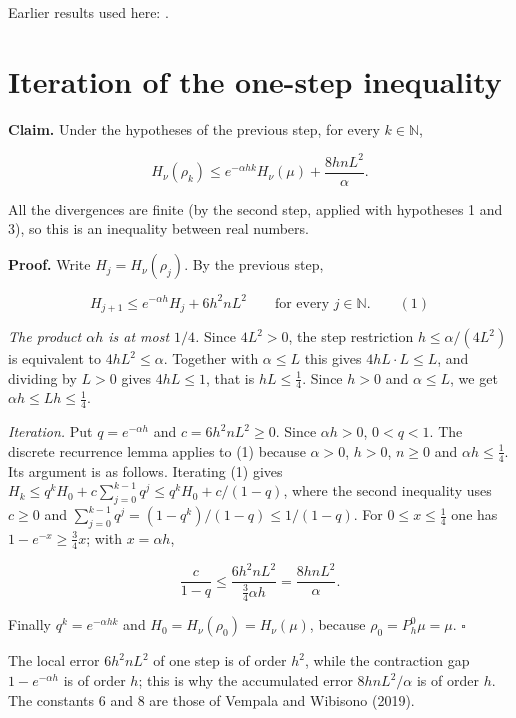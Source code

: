 \documentclass[11pt,a4paper]{article}
\begin{document}
Earlier results used here: \cite[Section~3.26.3]{LangevinLean2026ULASC}.

\section{\texorpdfstring{Iteration of the one-step inequality}{Iteration of the one-step inequality}}


\textbf{Claim.} Under the hypotheses of the previous step, for every \(k\in\mathbb N\),


\[H_\nu(\rho_k)\le e^{-\alpha hk}H_\nu(\mu)+\frac{8hnL^2}{\alpha}.\]


All the divergences are finite (by the second step, applied with hypotheses 1 and 3), so this is an inequality between real numbers.




\textbf{Proof.} Write \(H_j=H_\nu(\rho_j)\). By the previous step,


\[H_{j+1}\le e^{-\alpha h}H_j+6h^2nL^2\qquad\text{for every }j\in\mathbb N.\qquad(1)\]


\emph{The product \(\alpha h\) is at most \(1/4\).} Since \(4L^2>0\), the step restriction \(h\le\alpha/(4L^2)\) is equivalent to \(4hL^2\le\alpha\). Together with \(\alpha\le L\) this gives \(4hL\cdot L\le L\), and dividing by \(L>0\) gives \(4hL\le1\), that is \(hL\le\frac14\). Since \(h>0\) and \(\alpha\le L\), we get \(\alpha h\le Lh\le\frac14\).




\emph{Iteration.} Put \(q=e^{-\alpha h}\) and \(c=6h^2nL^2\ge0\). Since \(\alpha h>0\), \(0<q<1\). The discrete recurrence lemma \cite[Section~3.20.3]{LangevinLean2026ULALSI} applies to (1) because \(\alpha>0\), \(h>0\), \(n\ge0\) and \(\alpha h\le\frac14\). Its argument is as follows. Iterating (1) gives \(H_k\le q^kH_0+c\sum_{j=0}^{k-1}q^j\le q^kH_0+c/(1-q)\), where the second inequality uses \(c\ge0\) and \(\sum_{j=0}^{k-1}q^j=(1-q^k)/(1-q)\le1/(1-q)\). For \(0\le x\le\frac14\) one has \(1-e^{-x}\ge\frac34x\); with \(x=\alpha h\),


\[\frac{c}{1-q}\le\frac{6h^2nL^2}{\frac34\alpha h}=\frac{8hnL^2}{\alpha}.\]


Finally \(q^k=e^{-\alpha hk}\) and \(H_0=H_\nu(\rho_0)=H_\nu(\mu)\), because \(\rho_0=P_h^0\mu=\mu\). \(\square\)




The local error \(6h^2nL^2\) of one step is of order \(h^2\), while the contraction gap \(1-e^{-\alpha h}\) is of order \(h\); this is why the accumulated error \(8hnL^2/\alpha\) is of order \(h\). The constants \(6\) and \(8\) are those of Vempala and Wibisono (2019).
\end{document}
